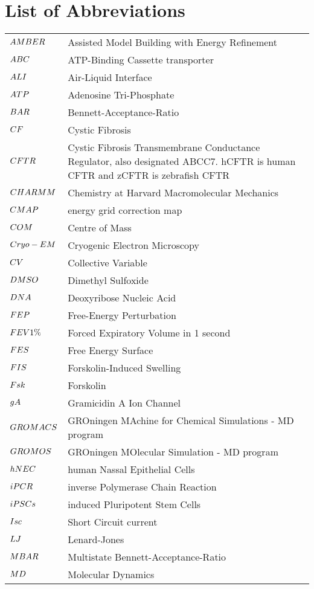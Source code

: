 \chapter*{List of Abbreviations}
\label{chap:abbrev}

\begin{center}
\begin{bfseries}
\newcommand\nomenclature[2]{#1 & #2 \\}
\begin{longtable}{@{}p{3cm}@{}p{\dimexpr\textwidth-1cm\relax}@{}}
\nomenclature{${\small AMBER}$}    {Assisted Model Building with Energy Refinement}
\nomenclature{${\small ABC}$}   {ATP-Binding Cassette transporter}
\nomenclature{${\small ALI}$}   {Air-Liquid Interface}
\nomenclature{${\small ATP}$}      {Adenosine Tri-Phosphate}
\nomenclature{${\small BAR}$}      {Bennett-Acceptance-Ratio}
\nomenclature{${\small CF}$}        {Cystic Fibrosis}
\nomenclature{${\small CFTR}$}      {Cystic Fibrosis Transmembrane Conductance Regulator, also designated ABCC7. hCFTR is human CFTR and zCFTR is zebrafish CFTR}
\nomenclature{${\small CHARMM}$}   {Chemistry at Harvard Macromolecular Mechanics}
\nomenclature{${\small CMAP}$}     {energy grid correction map}
\nomenclature{${\small COM}$}      {Centre of Mass}
\nomenclature{${\small Cryo-EM}$}  {Cryogenic Electron Microscopy}
\nomenclature{${\small CV}$}       {Collective Variable}
\nomenclature{${\small DMSO}$}     {Dimethyl Sulfoxide}
\nomenclature{${\small DNA}$}      {Deoxyribose Nucleic Acid}
\nomenclature{${\small FEP}$}      {Free-Energy Perturbation}
\nomenclature{${\small FEV1\%}$}   {Forced Expiratory Volume in 1 second}
\nomenclature{${\small FES}$}      {Free Energy Surface}
\nomenclature{${\small FIS}$}      {Forskolin-Induced Swelling}
\nomenclature{${\small Fsk}$}      {Forskolin}
\nomenclature{${\small gA}$}       {Gramicidin A Ion Channel}
\nomenclature{${\small GROMACS}$}  {GROningen MAchine for Chemical Simulations - MD program}
\nomenclature{${\small GROMOS}$}   {GROningen MOlecular Simulation - MD program}
\nomenclature{${\small hNEC}$}     {human Nassal Epithelial Cells}
\nomenclature{${\small iPCR}$}     {inverse Polymerase Chain Reaction}
\nomenclature{${\small iPSCs}$}    {induced Pluripotent Stem Cells}
\nomenclature{${\small Isc}$}      {Short Circuit current}
\nomenclature{${\small LJ}$}       {Lenard-Jones}
\nomenclature{${\small MBAR}$}     {Multistate Bennett-Acceptance-Ratio}
\nomenclature{${\small MD}$}       {Molecular Dynamics}

\end{longtable}
\end{bfseries}
\end{center}
